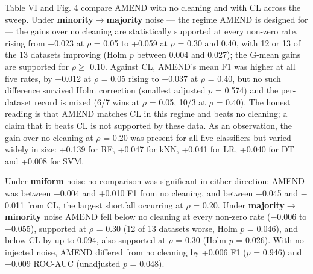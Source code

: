 \documentclass[conference]{IEEEtran}
\begin{document}
Table VI and Fig. 4 compare AMEND with no cleaning and with CL across the sweep. Under \textbf{minority$\rightarrow $majority} noise --- the regime AMEND is designed for --- the gains over no cleaning are statistically supported at every non-zero rate, rising from +0.023 at $\rho $ = 0.05 to +0.059 at $\rho $ = 0.30 and 0.40, with 12 or 13 of the 13 datasets improving (Holm $p$ between 0.004 and 0.027); the G-mean gains are supported for $\rho  \ge $ 0.10. Against CL, AMEND's mean F1 was higher at all five rates, by +0.012 at $\rho $ = 0.05 rising to +0.037 at $\rho $ = 0.40, but no such difference survived Holm correction (smallest adjusted $p$ = 0.574) and the per-dataset record is mixed (6/7 wins at $\rho $ = 0.05, 10/3 at $\rho $ = 0.40). The honest reading is that AMEND matches CL in this regime and beats no cleaning; a claim that it beats CL is not supported by these data. As an observation, the gain over no cleaning at $\rho $ = 0.20 was present for all five classifiers but varied widely in size: +0.139 for RF, +0.047 for kNN, +0.041 for LR, +0.040 for DT and +0.008 for SVM.

Under \textbf{uniform} noise no comparison was significant in either direction: AMEND was between $-$0.004 and +0.010 F1 from no cleaning, and between $-$0.045 and $-$0.011 from CL, the largest shortfall occurring at $\rho $ = 0.20. Under \textbf{majority$\rightarrow $minority} noise AMEND fell below no cleaning at every non-zero rate ($-$0.006 to $-$0.055), supported at $\rho $ = 0.30 (12 of 13 datasets worse, Holm $p$ = 0.046), and below CL by up to 0.094, also supported at $\rho $ = 0.30 (Holm $p$ = 0.026). With no injected noise, AMEND differed from no cleaning by +0.006 F1 ($p$ = 0.946) and $-$0.009 ROC-AUC (unadjusted $p$ = 0.048).
\end{document}

